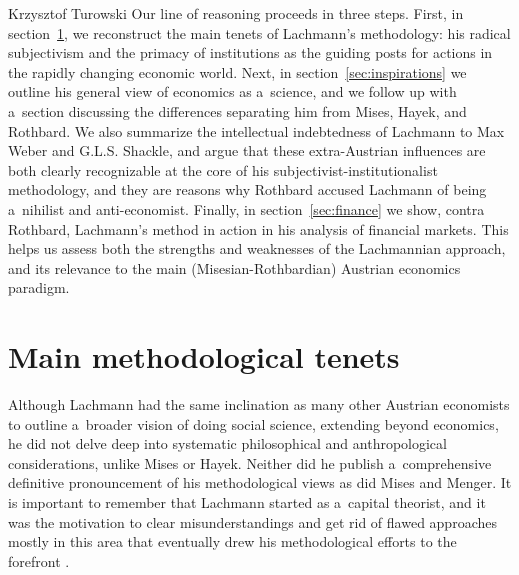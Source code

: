 \begin{artengenv}{Krzysztof Turowski}
Our line of reasoning proceeds in three steps.
First, in section~\ref{sec:tenets}, we reconstruct the main tenets of Lachmann's methodology: his radical subjectivism and the primacy of institutions as the guiding posts for actions in the rapidly changing economic world.
Next, in section~\ref{sec:inspirations} we outline his general view of economics as a~science, and we follow up with a~section discussing the differences separating him from Mises, Hayek, and Rothbard. We also summarize the intellectual indebtedness of Lachmann to Max Weber and G.L.S. Shackle, and argue that these extra-Austrian influences are both clearly recognizable at the core of his subjectivist-institutionalist methodology, and they are reasons why Rothbard accused Lachmann of being a~nihilist and anti-economist.
Finally, in section~\ref{sec:finance} we show, contra Rothbard, Lachmann's method in action in his analysis of financial markets. This helps us assess both the strengths and weaknesses of the Lachmannian approach, and its relevance to the main (Misesian-Rothbardian) Austrian economics paradigm.

\section{Main methodological tenets}
\label{sec:tenets}

Although Lachmann had the same inclination as many other Austrian economists to outline a~broader vision of doing social science, extending beyond economics, he did not delve deep into systematic philosophical and anthropological considerations, unlike Mises or Hayek. Neither did he publish a~comprehensive definitive pronouncement of his methodological views as did Mises and Menger.
It is important to remember that Lachmann started as a~capital theorist, and it was the motivation to clear misunderstandings and get rid of flawed approaches mostly in this area that eventually drew his methodological efforts to the forefront \parencite[215]{prychitko-review}.


\end{artengenv}
